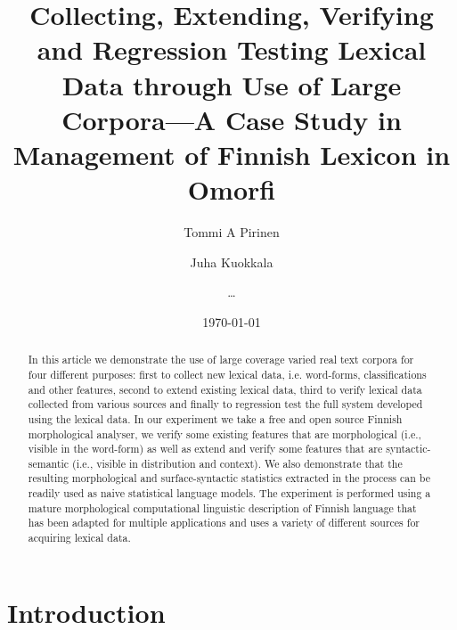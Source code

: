 \documentclass[a5paper]{article}
\title{Collecting, Extending, Verifying and Regression Testing Lexical Data through
Use of Large Corpora---A Case Study in Management of Finnish Lexicon in Omorfi}
\author{Tommi A Pirinen \and Juha Kuokkala \and \ldots}
\date{\today}
\begin{document}
\maketitle

\begin{abstract}
    In this article we demonstrate the use of large coverage varied real text
    corpora for four different purposes: first to collect new lexical data, i.e.
    word-forms, classifications and other features, second to extend existing
    lexical data, third to verify lexical data collected from various sources
    and finally to regression test the full system developed using the lexical
    data. In our experiment we take a free and open source Finnish morphological
    analyser, we verify some existing features that are morphological (i.e.,
    visible in the word-form) as well as  extend and verify some features that
    are syntactic-semantic (i.e., visible in distribution and context). We
    also demonstrate that the resulting morphological and surface-syntactic
    statistics extracted in the process can be readily used as naive statistical
    language models. The experiment is performed using a mature morphological
    computational linguistic description of Finnish language that has been
    adapted for multiple applications and uses a variety of different sources
    for acquiring lexical data.
\end{abstract}

\section{Introduction}
\label{sec:introduction}
\end{document}
